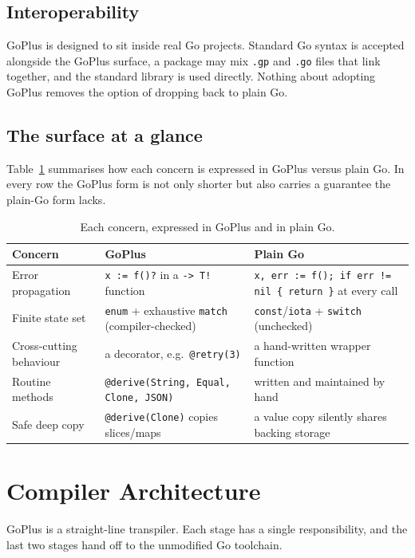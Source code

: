 \documentclass[11pt,a4paper]{article}
\begin{document}
\subsection{Interoperability}
GoPlus is designed to sit inside real Go projects. Standard Go syntax is accepted
alongside the GoPlus surface, a package may mix \texttt{.gp} and \texttt{.go}
files that link together, and the standard library is used directly. Nothing about
adopting GoPlus removes the option of dropping back to plain Go.

\subsection{The surface at a glance}
Table~\ref{tab:glance} summarises how each concern is expressed in GoPlus versus
plain Go. In every row the GoPlus form is not only shorter but also carries a
guarantee the plain-Go form lacks.

\begin{table}[ht]
\centering
\renewcommand{\arraystretch}{1.3}
\begin{tabularx}{\textwidth}{@{}p{} X X@{}}
\toprule
\textbf{\color{hustred}Concern} & \textbf{\color{hustred}GoPlus} & \textbf{\color{hustred}Plain Go} \\
\midrule
Error propagation & \texttt{x := f()?} in a \texttt{->\,T!} function &
  \texttt{x, err := f(); if err != nil \{ return \}} at every call \\
Finite state set & \texttt{enum} + exhaustive \texttt{match} (compiler-checked) &
  \texttt{const}/\texttt{iota} + \texttt{switch} (unchecked) \\
Cross-cutting behaviour & a decorator, e.g.\ \texttt{@retry(3)} &
  a hand-written wrapper function \\
Routine methods & \texttt{@derive(String, Equal, Clone, JSON)} &
  written and maintained by hand \\
Safe deep copy & \texttt{@derive(Clone)} copies slices/maps &
  a value copy silently shares backing storage \\
\bottomrule
\end{tabularx}
\caption{Each concern, expressed in GoPlus and in plain Go.}
\label{tab:glance}
\end{table}

\section{Compiler Architecture}
GoPlus is a straight-line transpiler. Each stage has a single responsibility, and
the last two stages hand off to the unmodified Go toolchain.
\end{document}
